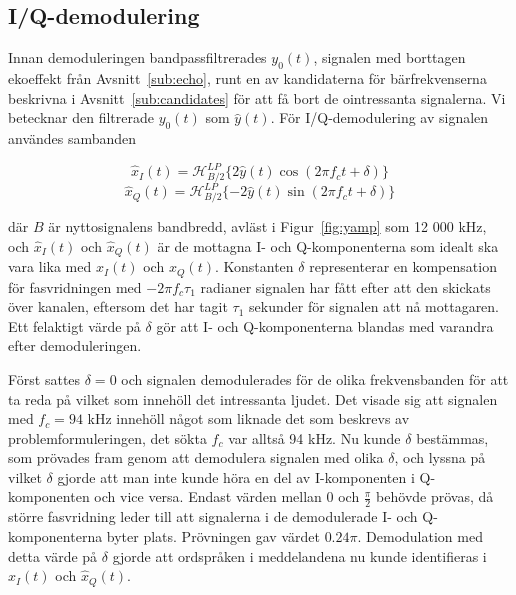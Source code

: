 \documentclass[10pt,twocolumn]{article}
\begin{document}
\subsection{I/Q-demodulering\label{sub:iq}}
Innan demoduleringen bandpassfiltrerades $y_0(t)$, signalen med borttagen
ekoeffekt från Avsnitt~\ref{sub:echo}, runt en av kandidaterna
för bärfrekvenserna beskrivna i Avsnitt~\ref{sub:candidates} för att få bort de
ointressanta signalerna. Vi betecknar den filtrerade $y_0(t)$ som $\hat{y}(t)$.
För I/Q-demodulering av signalen användes sambanden

\begin{equation*}
    \hat{x}_I(t) = \mathcal{H}_{B/2}^{LP}\{2\hat{y}(t)\cos(2\pi f_c t + \delta)\}
\end{equation*}
\begin{equation*}
    \hat{x}_Q(t) = \mathcal{H}_{B/2}^{LP}\{-2\hat{y}(t)\sin(2\pi f_c t + \delta)\}
\end{equation*}

där $B$ är nyttosignalens bandbredd, avläst i Figur~\ref{fig:yamp} som 12 000
kHz, och
$\hat{x}_I(t)$ och $\hat{x}_Q(t)$ är de mottagna I- och Q-komponenterna som
idealt ska vara lika med $x_I(t)$ och $x_Q(t)$.
Konstanten $\delta$ representerar en kompensation för fasvridningen med 
$-2\pi f_c \tau_1$ radianer signalen har fått efter
att den skickats över kanalen, eftersom det har tagit $\tau_1$ sekunder för
signalen att nå mottagaren. Ett felaktigt värde på $\delta$ gör att
I- och Q-komponenterna blandas med varandra efter demoduleringen.

Först sattes $\delta = 0$ och signalen demodulerades för de olika
frekvensbanden för att ta reda på vilket som innehöll det intressanta ljudet. Det
visade sig att signalen med $f_c = 94$ kHz innehöll något som liknade det som
beskrevs av problemformuleringen, det sökta $f_c$ var alltså 94 kHz.
Nu kunde $\delta$ bestämmas, som prövades fram genom att demodulera signalen med olika $\delta$, och
lyssna på vilket $\delta$ gjorde att man inte kunde höra en del av I-komponenten i
Q-komponenten och vice versa. Endast värden mellan 0 och $\frac{\pi}{2}$ behövde prövas,
då större fasvridning leder till att signalerna i de demodulerade I- och Q-komponenterna byter plats.
Prövningen gav värdet $0.24\pi$. Demodulation med detta värde på $\delta$ gjorde
att ordspråken i meddelandena nu kunde identifieras i $\hat{x}_I(t)$ och
$\hat{x}_Q(t)$.

\end{document}

